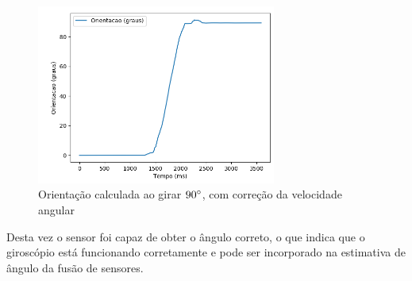 \documentclass[
	12pt,				%
	openright,			%
	twoside,			%
	convert,
	a4paper,			%
	english,			%
	french,				%
	spanish,			%
	brazil				%
	]{abntex2}
\begin{document}
\begin{figure}[H]
	\caption{Orientação calculada ao girar $90\degree$, com correção da velocidade angular}
\begin{center}
   \includegraphics[width=0.7\textwidth]{gyro_90_graus_fix}
\end{center}
\end{figure}
Desta vez o sensor foi capaz de obter o ângulo correto, o que indica que o giroscópio está funcionando corretamente e pode ser incorporado na estimativa de ângulo da fusão de sensores.
\end{document}
